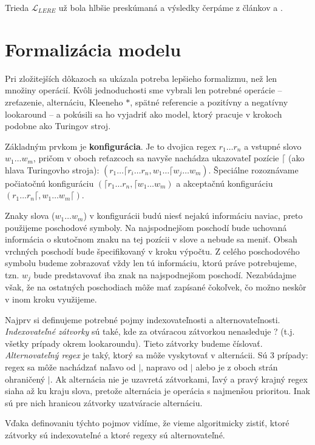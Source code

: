 \documentclass{svk_long_sk}
\def\lel{\mathscr{L}_{LERE}}
\begin{document}
Trieda $\lel$ už bola hlbšie preskúmaná a výsledky čerpáme z článkov \cite{ExtendedRegexPower} a \cite{ExtendedRegexIntersec}.
 
\section{Formalizácia modelu}
Pri zložitejších dôkazoch sa ukázala potreba lepšieho formalizmu, než len množiny operácií. Kvôli jednoduchosti sme vybrali len potrebné operácie -- zreťazenie, alternáciu, Kleeneho $*$, spätné referencie a pozitívny a negatívny lookaround -- a pokúsili sa ho vyjadriť ako model, ktorý pracuje v krokoch podobne ako Turingov stroj.

Základným prvkom je \textbf{konfigurácia}. Je to dvojica regex $r_1 \dots r_n$ a vstupné slovo $w_1 \dots w_m$, pričom v oboch reťazcoch sa navyše nachádza ukazovateľ pozície $\lceil$ (ako hlava Turingovho stroja): $(r_1\dots \lceil r_i\dots r_n,w_1 \dots \lceil w_j \dots w_m)$. Špeciálne rozoznávame počiatočnú konfiguráciu $(\lceil r_1 \dots r_n,\lceil w_1 \dots w_m)$ a akceptačnú konfiguráciu $(r_1 \dots r_n \lceil, w_1 \dots w_m \lceil)$.

Znaky slova ($w_1\dots w_m$) v konfigurácii budú niesť nejakú informáciu naviac, preto použijeme poschodové symboly. Na najspodnejšom poschodí bude uchovaná informácia o skutočnom znaku na tej pozícii v slove a nebude sa meniť. Obsah vrchných poschodí bude špecifikovaný v kroku výpočtu. Z celého poschodového symbolu budeme zobrazovať vždy len tú informáciu, ktorú práve potrebujeme, tzn. $w_j$ bude predstavovať iba znak na najspodnejšom poschodí. Nezabúdajme však, že na ostatných poschodiach môže mať zapísané čokoľvek, čo možno neskôr v inom kroku využijeme.

Najprv si definujeme potrebné pojmy indexovateľnosti a alternovateľnosti. \textit{Indexovateľné zátvorky} sú také, kde za otváracou zátvorkou nenasleduje ? (t.j. všetky prípady okrem lookaroundu). Tieto zátvorky budeme číslovať. \textit{Alternovateľný regex} je taký, ktorý sa môže vyskytovať v alternácii. Sú 3 prípady: regex sa môže nachádzať naľavo od $|$, napravo od $|$ alebo je z oboch strán ohraničený $|$. Ak alternácia nie je uzavretá zátvorkami, ľavý a pravý krajný regex siaha až ku kraju slova, pretože alternácia je operácia s najmenšou prioritou. Inak sú pre nich hranicou zátvorky uzatváracie alternáciu.

Vďaka definovaniu týchto pojmov vidíme, že vieme algoritmicky zistiť, ktoré zátvorky sú indexovateľné a ktoré regexy sú alternovateľné.
\end{document}

